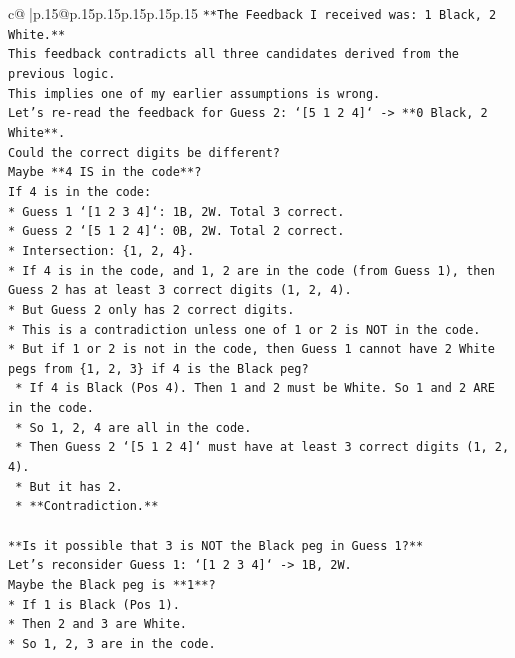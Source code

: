 \documentclass{article}
\begin{document}
{\begin{supertabular}{c@{$\;$}|p{.15\linewidth}@{}p{.15\linewidth}p{.15\linewidth}p{.15\linewidth}p{.15\linewidth}p{.15\linewidth}}
{{{\texttt{**The Feedback I received was: 1 Black, 2 White.**} \\
\texttt{This feedback contradicts all three candidates derived from the previous logic.} \\
\texttt{This implies one of my earlier assumptions is wrong.} \\
\texttt{Let's re{-}read the feedback for Guess 2: `{[}5 1 2 4{]}` {-}> **0 Black, 2 White**.} \\
\texttt{Could the correct digits be different?} \\
\texttt{Maybe **4 IS in the code**?} \\
\texttt{If 4 is in the code:} \\
\texttt{*   Guess 1 `{[}1 2 3 4{]}`: 1B, 2W. Total 3 correct.} \\
\texttt{*   Guess 2 `{[}5 1 2 4{]}`: 0B, 2W. Total 2 correct.} \\
\texttt{*   Intersection: \{1, 2, 4\}.} \\
\texttt{*   If 4 is in the code, and 1, 2 are in the code (from Guess 1), then Guess 2 has at least 3 correct digits (1, 2, 4).} \\
\texttt{*   But Guess 2 only has 2 correct digits.} \\
\texttt{*   This is a contradiction unless one of 1 or 2 is NOT in the code.} \\
\texttt{*   But if 1 or 2 is not in the code, then Guess 1 cannot have 2 White pegs from \{1, 2, 3\} if 4 is the Black peg?} \\
\texttt{    *   If 4 is Black (Pos 4). Then 1 and 2 must be White. So 1 and 2 ARE in the code.} \\
\texttt{    *   So 1, 2, 4 are all in the code.} \\
\texttt{    *   Then Guess 2 `{[}5 1 2 4{]}` must have at least 3 correct digits (1, 2, 4).} \\
\texttt{    *   But it has 2.} \\
\texttt{    *   **Contradiction.**} \\
\\ 
\texttt{**Is it possible that 3 is NOT the Black peg in Guess 1?**} \\
\texttt{Let's reconsider Guess 1: `{[}1 2 3 4{]}` {-}> 1B, 2W.} \\
\texttt{Maybe the Black peg is **1**?} \\
\texttt{*   If 1 is Black (Pos 1).} \\
\texttt{*   Then 2 and 3 are White.} \\
\texttt{*   So 1, 2, 3 are in the code.} \\
}}}
\end{supertabular}}
\end{document}
